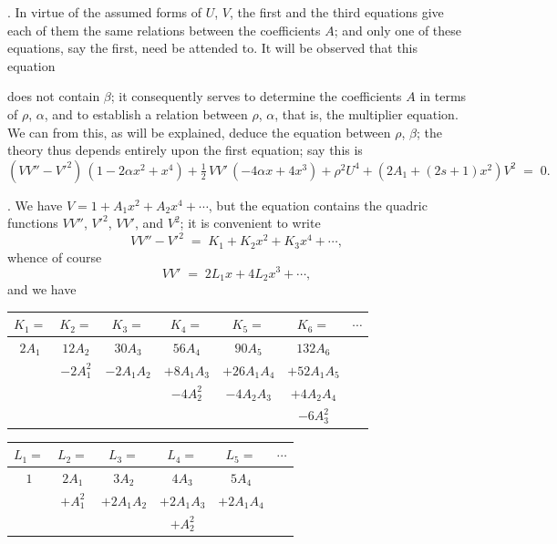 \documentclass[11pt]{article}
\begin{document}
\medskip

. In virtue of the assumed forms of $U$, $V$, the first and the third equations give each of them the same relations between the coefficients $A$; and only one of these equations, say the first, need be attended to. It will be observed that this equation

\newpage

\noindent does not contain $\beta$; it consequently serves to determine the coefficients $A$ in terms of $\rho$, $\alpha$, and to establish a relation between $\rho$, $\alpha$, that is, the multiplier equation. We can from this, as will be explained, deduce the equation between $\rho$, $\beta$; the theory thus depends entirely upon the first equation; say this is
\[
(V V'' - V'^2)\,(1 - 2\alpha x^2 + x^4) + \tfrac{1}{2}\,V V'\,(-4\alpha x + 4 x^3) + \rho^2 U^4 + (2 A_1 + (2s+1)x^2)V^2 \;=\; 0.
\]

\medskip

. We have $V = 1 + A_1 x^2 + A_2 x^4 + \cdots$, but the equation contains the quadric functions $V V''$, $V'^2$, $V V'$, and $V^2$; it is convenient to write
\[
V V'' - V'^2 \;=\; K_1 + K_2 x^2 + K_3 x^4 + \cdots,
\]
whence of course
\[
V V' \;=\; 2 L_1 x + 4 L_2 x^3 + \cdots,
\]
and we have
\medskip

\begin{center}
\begin{tabular}{|c|c|c|c|c|c|c|}
\hline
$K_1 =$ & $K_2 =$ & $K_3 =$ & $K_4 =$ & $K_5 =$ & $K_6 =$ & $\cdots$ \\
\hline
$2 A_1$ & $12 A_2$ & $30 A_3$ & $56 A_4$ & $90 A_5$ & $132 A_6$ & \\
 & $-2 A_1^2$ & $-2 A_1 A_2$ & $+8 A_1 A_3$ & $+26 A_1 A_4$ & $+52 A_1 A_5$ & \\
 & & & $-4 A_2^2$ & $-4 A_2 A_3$ & $+4 A_2 A_4$ & \\
 & & & & & $-6 A_3^2$ & \\
\hline
\end{tabular}
\end{center}

\medskip

\begin{center}
\begin{tabular}{|c|c|c|c|c|c|}
\hline
$L_1 =$ & $L_2 =$ & $L_3 =$ & $L_4 =$ & $L_5 =$ & $\cdots$ \\
\hline
$1$ & $2 A_1$ & $3 A_2$ & $4 A_3$ & $5 A_4$ & \\
 & $+A_1^2$ & $+2 A_1 A_2$ & $+2 A_1 A_3$ & $+2 A_1 A_4$ & \\
 & & & $+A_2^2$ & & \\
\hline
\end{tabular}
\end{center}
\end{document}
